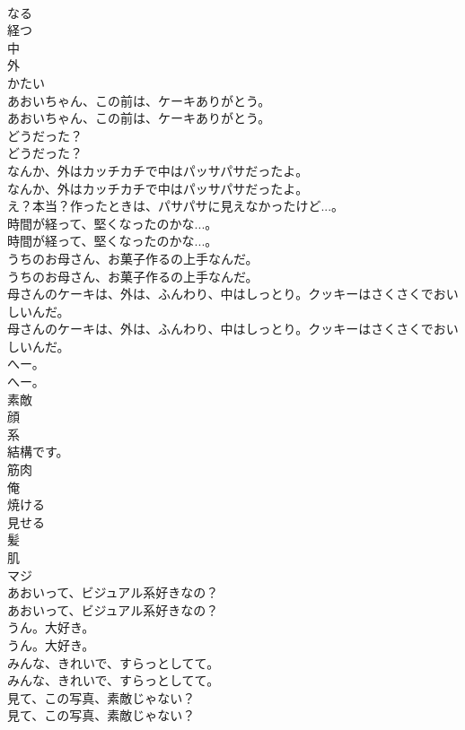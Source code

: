 \documentclass[8pt]{extreport}
\begin{document}
\begin{CJK}{UTF8}{min}
\\	なる
\\	経つ
\\	中
\\	外
\\	かたい
\\	あおいちゃん、この前は、ケーキありがとう。	
\\	あおいちゃん、この前は、ケーキありがとう。 
\\	どうだった？	
\\	どうだった？ 
\\	なんか、外はカッチカチで中はパッサパサだったよ。	
\\	なんか、外はカッチカチで中はパッサパサだったよ。 
\\	え？本当？作ったときは、パサパサに見えなかったけど...。 
\\	時間が経って、堅くなったのかな...。	
\\	時間が経って、堅くなったのかな...。 
\\	うちのお母さん、お菓子作るの上手なんだ。	
\\	うちのお母さん、お菓子作るの上手なんだ。 
\\	母さんのケーキは、外は、ふんわり、中はしっとり。クッキーはさくさくでおいしいんだ。	
\\	母さんのケーキは、外は、ふんわり、中はしっとり。クッキーはさくさくでおいしいんだ。 
\\	へー。	
\\	へー。 
\\	素敵
\\	顔
\\	系
\\	結構です。
\\	筋肉
\\	俺
\\	焼ける
\\	見せる
\\	髪
\\	肌
\\	マジ
\\	あおいって、ビジュアル系好きなの？	
\\	あおいって、ビジュアル系好きなの？ 
\\	うん。大好き。	
\\	うん。大好き。 
\\	みんな、きれいで、すらっとしてて。	
\\	みんな、きれいで、すらっとしてて。 
\\	見て、この写真、素敵じゃない？	
\\	見て、この写真、素敵じゃない？ 

\end{CJK}
\end{document}
